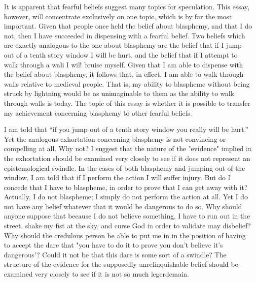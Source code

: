 \documentclass[10pt,twoside]{memoir}
\begin{document}
It is apparent that fearful beliefs suggest many topics for speculation. 
This essay, however, will concentrate exclusively on one topic, which is by 
far the most important. Given that people once held the belief about 
blasphemy, and that I do not, then I have succeeded in dispensing with a 
fearful belief. Two beliefs which are exactly analogous to the one about 
blasphemy are the belief that if I jump out of a tenth story window I will be 
hurt, and the belief that if I attempt to walk through a wali I wil! bruise 
myself. Given that I am able to dispense with the belief about blasphemy, it 
follows that, in effect, I am able to walk through walls relative to medieval 
people. That is, my ability to blaspheme without being struck by lightning 
would be as unimaginable to them as the ability to walk through walls is 
today. The topic of this essay is whether it is possible to transfer my 
achievement concerning blasphemy to other fearful beliefs. 

\visbreak

I am told that \enquote{if you jump out of a tenth story window you really will 
be hurt.} Yet the analogous exhortation concerning blasphemy is not 
convincing or compelling at all. Why not? I suggest that the nature of the 
"evidence" implied in the exhortation should be examined very closely to 
see if it does not represent an epistemological swindle. In the cases of both 
blasphemy and jumping out of the window, I am told that if I perform the 
action I will suffer injury. But do I concede that I have to blaspheme, in 
order to prove that I can get away with it? Actually, I do not blaspheme; I 
simply do not perform the action at all. Yet I do not have any belief 
whatever that it would be dangerous to do so. Why should anyone suppose 
that because I do not believe something, I have to run out in the street, 
shake my fist at the sky, and curse God in order to validate may disbelief? 
Why should the credulous person be able to put me in in the position of 
having to accept the dare that "you have to do it to prove you don't believe 
it's dangerous'? Could it not be that this dare is some sort of a swindle? 
The structure of the evidence for the supposedly unrelinquishable belief 
should be examined very closely to see if it is not so much legerdemain. 
\end{document}
